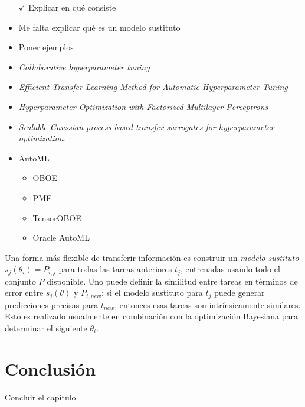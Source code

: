 \begin{itemize}
	\item[$\checkmark$] Explicar en qué consiste
	\item Me falta explicar qué es un modelo sustituto
	\item Poner ejemplos
	\item \textit{Collaborative hyperparameter tuning} \cite{bardenet2013hyper}
	\item \textit{Efficient Transfer Learning Method for Automatic Hyperparameter Tuning} \cite{yogatama2014efficient}
	\item \textit{Hyperparameter Optimization with Factorized Multilayer Perceptrons} \cite{schilling2015hyp}
	\item \textit{Scalable Gaussian process-based transfer surrogates for hyperparameter optimization.} \cite{witsuba2018scalable}
	\item AutoML \begin{itemize}
		\item OBOE
		\item PMF
		\item TensorOBOE
		\item Oracle AutoML
	\end{itemize}
\end{itemize}

\quad

Una forma más flexible de transferir información es construir un \textit{modelo sustituto} $s_j(\theta_i) = P_{i,j}$ para todas las tareas anteriores $t_j$, entrenadas usando todo el conjunto $P$ disponible. Uno puede definir la similitud entre tareas en términos de error entre $s_j(\theta)$ y $P_{i, new}$: si el modelo sustituto para $t_j$ puede generar predicciones precisas para $t_{new}$, entonces esas tareas son intrínsicamente similares. Esto es realizado usualmente en combinación con la optimización Bayesiana para determinar el siguiente $\theta_i$. 



\section{Conclusión}\label{sec:conclusion}

Concluir el capítulo


